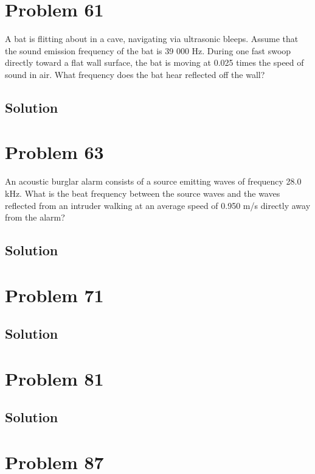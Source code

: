 \documentclass[12pt]{article}
\begin{document}
    \pagebreak
    \section{Problem 61}
        A bat is flitting about in a cave, navigating via ultrasonic bleeps. 
        Assume that the sound emission frequency of the bat is 39 000 Hz. 
        During one fast swoop directly toward a flat wall surface, the bat is moving at 0.025 times the speed of sound in air. 
        What frequency does the bat hear reflected off the wall?

        \subsection{Solution}

    \pagebreak
    \section{Problem 63}
        An acoustic burglar alarm consists of a source emitting waves of frequency 28.0 kHz. 
        What is the beat frequency between the source waves and the waves reflected from an intruder walking at an average speed of 0.950 m/s directly away from the alarm?

        \subsection{Solution}

    \pagebreak
    \section{Problem 71}

        \subsection{Solution}

    \pagebreak
    \section{Problem 81}

        \subsection{Solution}

    \pagebreak
    \section{Problem 87}
\end{document}

